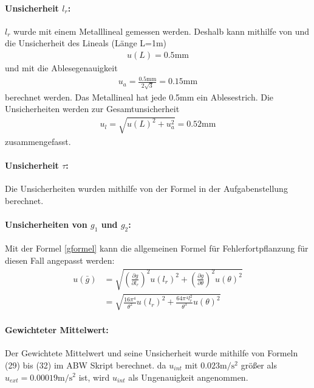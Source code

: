 \documentclass[11pt, a4paper]{article}
\begin{document}
    \paragraph{Unsicherheit $l_r$:}
    $l_r$ wurde mit einem Metalllineal gemessen werden. Deshalb kann mithilfe von \cite[Gleichung (40)]{ABW}
    und \cite[Tabelle 5]{ABW} die Unsicherheit des Lineals (Länge L=1m)
    \begin{align}
        u(L) = 0.5\si{\milli\metre}
    \end{align}
    und mit \cite[Tabelle 1]{ABW} die Ablesegenauigkeit
    \begin{align}
        u_a = \frac{0.5\si{\milli\metre}}{2\sqrt{3}} = 0.15\si{\milli\metre}
    \end{align}
    berechnet werden. Das Metallineal hat jede 0.5mm ein Ablesestrich.
    Die Unsicherheiten werden zur Gesamtunsicherheit
    \begin{align}
        u_l = \sqrt{u(L)^2 + u_a^2 } = 0.52\si{\milli\metre}
    \end{align} 
    zusammengefasst.
    \paragraph{Unsicherheit $\tau$:}
    Die Unsicherheiten wurden mithilfe von der Formel in der Aufgabenstellung \cite[Aufgabe 8]{pen} berechnet.

    \paragraph{Unsicherheiten von $g_1$ und $g_2$:}
    Mit der Formel \ref{gformel} kann die allgemeinen Formel für Fehlerfortpflanzung
     \cite[Formel (20)]{ABW} für diesen Fall angepasst werden:
     \begin{align}
         u(\bar{g}) &= \sqrt{\left(\frac{\partial g}{\partial l_r}\right)^2 u(l_r)^2 +
         \left(\frac{\partial g}{\partial \theta}\right)^2 u(\theta)^2} \nonumber \\
         &= \sqrt{\frac{16\pi^4}{\theta^2} u(l_r)^2 + \frac{64\pi^4l_r^2}{\theta^3} u(\theta)^2}
     \end{align}
    \paragraph{Gewichteter Mittelwert:}
    Der Gewichtete Mittelwert und seine Unsicherheit wurde mithilfe von
    Formeln (29) bis (32) im ABW Skript\cite{ABW} berechnet. da $u_{int}$ mit $0.023\si{\metre\per\square\second}$
    größer als $u_{ext} = 0.00019\si{\metre\per\square\second}$ ist, wird $u_{int}$ als Ungenauigkeit angenommen.


    
    
\end{document}
